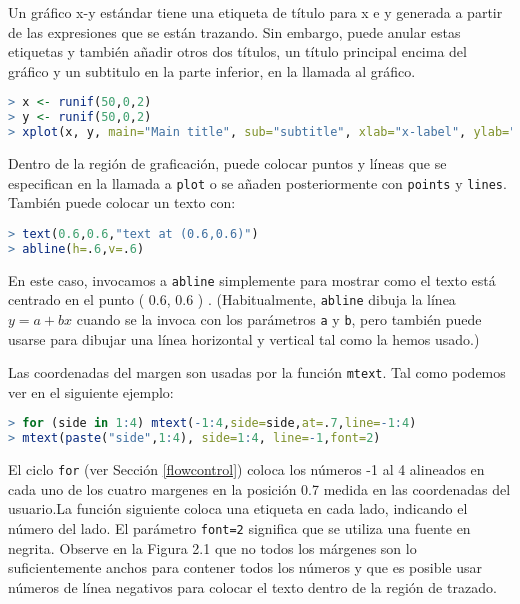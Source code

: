Un gráfico x-y estándar tiene una etiqueta de título para x e y generada a
partir de las expresiones que se están trazando. Sin embargo, puede anular estas
etiquetas y también añadir otros dos títulos, un título principal encima del
gráfico y un subtitulo en la parte inferior, en la llamada al gráfico.

\begin{lstlisting}[language=R]
> x <- runif(50,0,2)
> y <- runif(50,0,2)
> xplot(x, y, main="Main title", sub="subtitle", xlab="x-label", ylab="y-label")
\end{lstlisting}

Dentro de la región de graficación, puede colocar puntos y líneas que se especifican
en la llamada a \texttt{plot} o se añaden posteriormente con \texttt{points} y
\texttt{lines}. También puede colocar un texto con:

\begin{lstlisting}[language=R]
> text(0.6,0.6,"text at (0.6,0.6)")
> abline(h=.6,v=.6)
\end{lstlisting}

En este caso, invocamos a \texttt{abline} simplemente para mostrar como el
texto está centrado en el punto ( 0.6, 0.6 ) . (Habitualmente, \texttt{abline}
dibuja la línea $y = a + bx$ cuando se la invoca con los parámetros \texttt{a}
y \texttt{b}, pero también puede usarse para dibujar una línea horizontal y
vertical tal como la hemos usado.)

Las coordenadas del margen son usadas por la función \texttt{mtext}. Tal como
podemos ver en el siguiente ejemplo:

\begin{lstlisting}[language=R]
> for (side in 1:4) mtext(-1:4,side=side,at=.7,line=-1:4)
> mtext(paste("side",1:4), side=1:4, line=-1,font=2)
\end{lstlisting}

El ciclo \texttt{for} (ver Sección \ref{flowcontrol}) coloca los números -1 al 4
alineados en cada uno de los cuatro margenes en la posición 0.7 medida en las
coordenadas del usuario.La función siguiente coloca una etiqueta en cada lado,
indicando el número del lado. El parámetro \texttt{font=2} significa que se
utiliza una fuente en negrita. Observe en la Figura 2.1 que no todos los
márgenes son lo suficientemente anchos para contener todos los números y que es
posible usar números de línea negativos para colocar el texto dentro de la
región de trazado.


